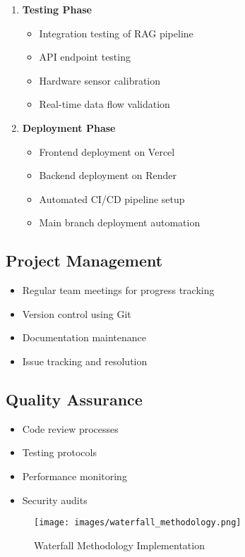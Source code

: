 \begin{enumerate}
    \item \textbf{Testing Phase}
    \begin{itemize}
        \item Integration testing of RAG pipeline
        \item API endpoint testing
        \item Hardware sensor calibration
        \item Real-time data flow validation
    \end{itemize}

    \item \textbf{Deployment Phase}
    \begin{itemize}
        \item Frontend deployment on Vercel
        \item Backend deployment on Render
        \item Automated CI/CD pipeline setup
        \item Main branch deployment automation
    \end{itemize}
\end{enumerate}

\subsection{Project Management}
\begin{itemize}
    \item Regular team meetings for progress tracking
    \item Version control using Git
    \item Documentation maintenance
    \item Issue tracking and resolution
\end{itemize}

\subsection{Quality Assurance}
\begin{itemize}
    \item Code review processes
    \item Testing protocols
    \item Performance monitoring
    \item Security audits
\end{itemize}

\begin{figure}[H]
    \centering
    \texttt{[image: images/waterfall\_methodology.png]}
    \caption{Waterfall Methodology Implementation}
\end{figure} 